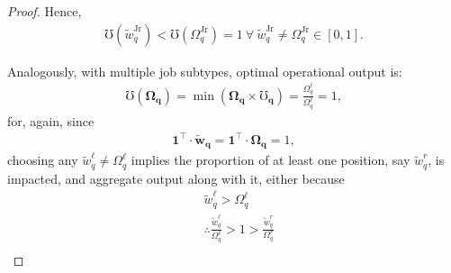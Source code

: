 \documentclass[hidelinks, nonatbib]{elsarticle}
\begin{document}
\begin{lemma}
\begin{proof}
        Hence, 
        \begin{gather}
            \mho(\tilde{w}_{q}^{\text{Jr}}) < 
            \mho(\Omega_{q}^{\text{Jr}}) 
            = 1
            \
            \forall
            \
            \tilde{w}_{q}^{\text{Jr}}
            \neq
            \Omega_{q}^{\text{Jr}}
            \in [0,1]
            .
        \end{gather}
        
        Analogously, with multiple job subtypes, optimal operational output is:
        \begin{gather}
            \mho(\boldsymbol{\Omega_q})
            = 
            \min(
                \boldsymbol{\Omega_q}
                \times
                \boldsymbol{\mho_q}
            )
            =
            \frac{
                \Omega_{q}^{\ell}
            }{
                \Omega_{q}^{\ell}
            }
            =
            1
            ,
        \end{gather}
        for, again, since
        \begin{gather}
            \boldsymbol{1} ^ {\top}
            \cdot
            \boldsymbol{\tilde{w}_{q}}
            =
            \boldsymbol{1} ^ {\top}
            \cdot
            \boldsymbol{\Omega_{q}}
            = 1
            ,
        \end{gather}
        choosing any $\tilde{w}_{q}^{\ell} \neq \Omega_{q}^{\ell}$ implies the proportion of at least one position, say $\tilde{w}_{q}^{r}$, is impacted, and aggregate output along with it, either because
        \begin{align}
            &
            \tilde{w}_{q}^{\ell} > \Omega_{q}^{\ell}
            \\
            &\therefore
            \frac{
                \tilde{w}_{q}^{\ell}
            }{
                \Omega_{q}^{\ell}
            }
            > 
            1
            > 
            \frac{
                \tilde{w}_{q}^{r}
            }{
                \Omega_{q}^{r}
            }
            \\

\end{align}
\end{proof}
\end{lemma}
\end{document}
